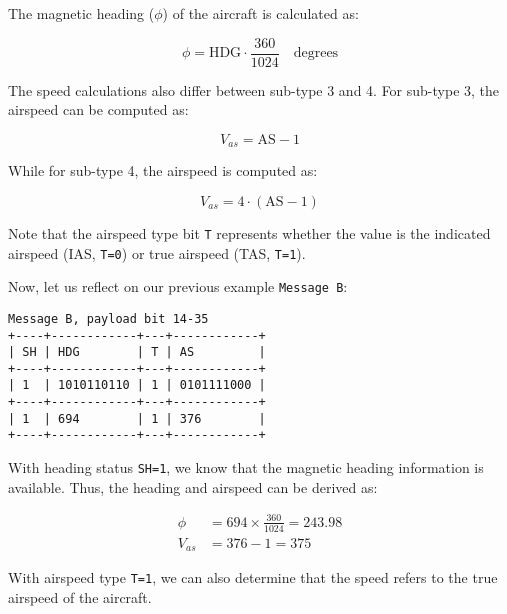 The magnetic heading ($\phi$) of the aircraft is calculated as:

\begin{equation}
  \phi = \mathrm{HDG} \cdot \frac{360}{1024}  \quad \text{degrees}
\end{equation}

The speed calculations also differ between sub-type 3 and 4. For sub-type 3, the airspeed can be computed as:

\begin{equation}
  V_{as} = \mathrm{AS} - 1
\end{equation}

While for sub-type 4, the airspeed is computed as:

\begin{equation}
  V_{as} = 4 \cdot (\mathrm{AS} - 1)
\end{equation}

Note that the airspeed type bit \texttt{T} represents whether the value is the indicated airspeed (IAS, \texttt{T=0}) or true airspeed (TAS, \texttt{T=1}).

Now, let us reflect on our previous example \texttt{Message B}:

\begin{verbatim}
Message B, payload bit 14-35
+----+------------+---+------------+
| SH | HDG        | T | AS         |
+----+------------+---+------------+
| 1  | 1010110110 | 1 | 0101111000 |
+----+------------+---+------------+
| 1  | 694        | 1 | 376        |
+----+------------+---+------------+
\end{verbatim}

With heading status \texttt{SH=1}, we know that the magnetic heading information is available. Thus, the heading and airspeed can be derived as:

\begin{align}
  \phi &= 694 \times \frac{360}{1024} = 243.98 \\
  V_{as} &= 376 - 1 = 375
\end{align}

With airspeed type \texttt{T=1}, we can also determine that the speed refers to the true airspeed of the aircraft.


